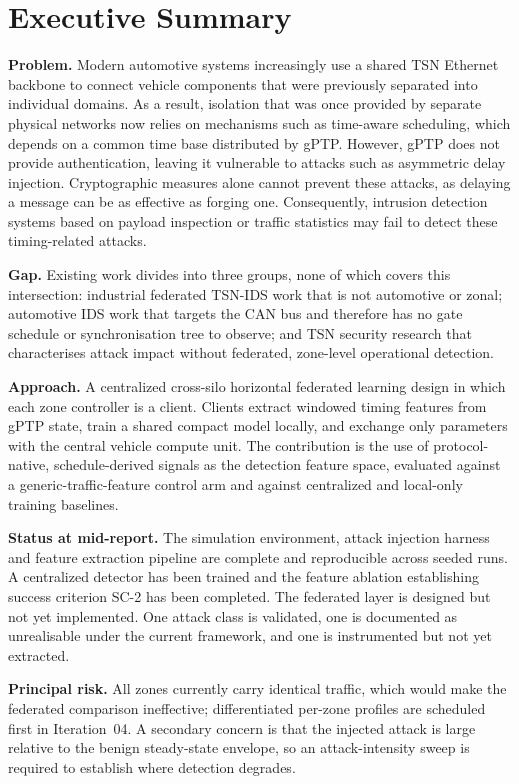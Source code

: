 \chapter*{Executive Summary}
\textbf{Problem.} Modern automotive systems increasingly use a shared TSN
Ethernet backbone to connect vehicle components that were previously separated
into individual domains. As a result, isolation that was once provided by 
separate physical networks now relies on mechanisms such as time-aware scheduling, 
which depends on a common time base distributed by gPTP. However, gPTP does not 
provide authentication, leaving it vulnerable to attacks such as asymmetric delay 
injection. Cryptographic measures alone cannot prevent these attacks, as delaying 
a message can be as effective as forging one. Consequently, intrusion detection 
systems based on payload inspection or traffic statistics may fail to detect these 
timing-related attacks.

\textbf{Gap.} Existing work divides into three groups, none of which covers this
intersection: industrial federated TSN-IDS work that is not automotive or zonal;
automotive IDS work that targets the CAN bus and therefore has no gate schedule or
synchronisation tree to observe; and TSN security research that characterises attack
impact without federated, zone-level operational detection.

\textbf{Approach.} A centralized cross-silo horizontal federated learning design in
which each zone controller is a client. Clients extract windowed timing features from
gPTP state, train a shared compact model locally, and exchange only parameters with
the central vehicle compute unit. The contribution is the use of protocol-native,
schedule-derived signals as the detection feature space, evaluated against a
generic-traffic-feature control arm and against centralized and local-only training
baselines.

\textbf{Status at mid-report.} The simulation environment, attack injection harness
and feature extraction pipeline are complete and reproducible across seeded runs. A
centralized detector has been trained and the feature ablation establishing success
criterion SC-2 has been completed. The federated layer is designed but not yet
implemented. One attack class is validated, one is documented as unrealisable under the
current framework, and one is instrumented but not yet extracted.

\textbf{Principal risk.} All zones currently carry identical traffic, which
would make the federated comparison ineffective; differentiated per-zone
profiles are scheduled first in Iteration~04. A secondary concern is that the injected
attack is large relative to the benign steady-state envelope, so an attack-intensity
sweep is required to establish where detection degrades.
